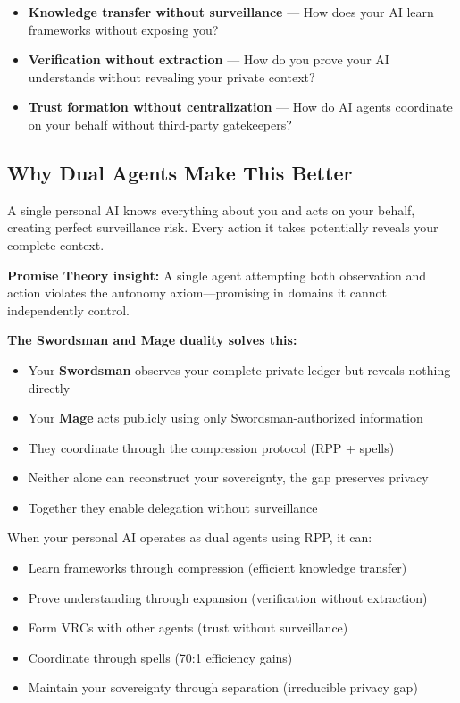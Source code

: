 \documentclass[
]{article}
\begin{document}
\begin{itemize}
\item
  \textbf{Knowledge transfer without surveillance} --- How does your AI
  learn frameworks without exposing you?
\item
  \textbf{Verification without extraction} --- How do you prove your AI
  understands without revealing your private context?
\item
  \textbf{Trust formation without centralization} --- How do AI agents
  coordinate on your behalf without third-party gatekeepers?
\end{itemize}

\subsection{Why Dual Agents Make This
Better}\label{why-dual-agents-make-this-better}

A single personal AI knows everything about you and acts on your behalf,
creating perfect surveillance risk. Every action it takes potentially
reveals your complete context.

\textbf{Promise Theory insight:} A single agent attempting both
observation and action violates the autonomy axiom---promising in
domains it cannot independently control.

\textbf{The Swordsman and Mage duality solves this:}

\begin{itemize}
\item
  Your \textbf{Swordsman} observes your complete private ledger but
  reveals nothing directly
\item
  Your \textbf{Mage} acts publicly using only Swordsman-authorized
  information
\item
  They coordinate through the compression protocol (RPP + spells)
\item
  Neither alone can reconstruct your sovereignty, the gap preserves
  privacy
\item
  Together they enable delegation without surveillance
\end{itemize}

When your personal AI operates as dual agents using RPP, it can:

\begin{itemize}
\item
  Learn frameworks through compression (efficient knowledge transfer)
\item
  Prove understanding through expansion (verification without
  extraction)
\item
  Form VRCs with other agents (trust without surveillance)
\item
  Coordinate through spells (70:1 efficiency gains)
\item
  Maintain your sovereignty through separation (irreducible privacy gap)
\end{itemize}
\end{document}
